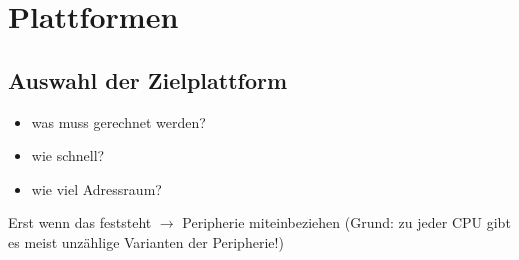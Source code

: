 \vspace{-2.5\baselineskip}
\section{Plattformen}
\vspace{-0.8\baselineskip}
\begin{minipage}{0.4\textwidth}
\flushleft{}
    \vspace{-0.8\baselineskip}
    \subsection{Auswahl der Zielplattform}
    \begin{itemize}
        \item was muss gerechnet werden?
        \vspace{-0.8\baselineskip}
        \item wie schnell?
        \vspace{-0.8\baselineskip}
        \item wie viel Adressraum?
    \end{itemize}
    Erst wenn das feststeht $\rightarrow$ Peripherie miteinbeziehen (Grund: zu jeder CPU gibt es meist unzählige Varianten der Peripherie!)
\end{minipage}
